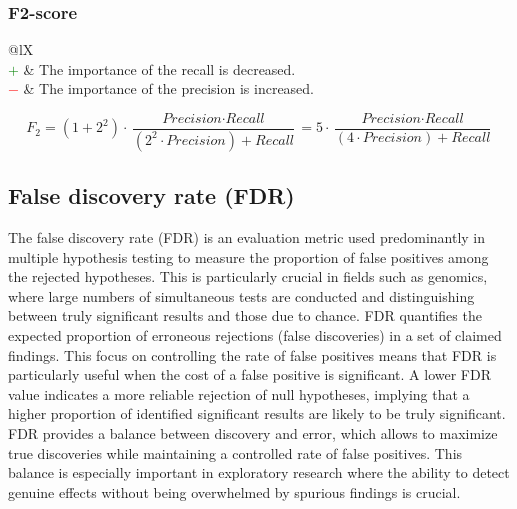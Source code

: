 \documentclass{article}
\begin{document}
\subsubsection[F2-score]{F2-score \cite{van2004geometry, taha2015metrics}}

\begin{table}[H]\centering
    \begin{tabularx}{\textwidth}{@{}lX}
         \\
        \textcolor{Green}{$+$} & The importance of the recall is decreased. \\
        \textcolor{Red}{$-$}   & The importance of the precision is increased.
    \end{tabularx}
\end{table}

\begin{equation}
    F_2 = (1 + 2^2) \cdot \dfrac{\textit{Precision} \cdot \textit{Recall}}{(2^2 \cdot \textit{Precision}) + \textit{Recall}} = 5 \cdot \dfrac{\textit{Precision} \cdot \textit{Recall}}{(4 \cdot \textit{Precision}) + \textit{Recall}}
%
    \label{equation:F2-score}
\end{equation}


\subsection[False discovery rate (FDR)]{False discovery rate (FDR) \cite{benjamini1995controlling, benjamini2001control}}

The false discovery rate (FDR) \cite{benjamini1995controlling, benjamini2001control} is an evaluation metric used predominantly in multiple hypothesis testing to measure the proportion of false positives among the rejected hypotheses. This is particularly crucial in fields such as genomics, where large numbers of simultaneous tests are conducted and distinguishing between truly significant results and those due to chance. FDR quantifies the expected proportion of erroneous rejections (false discoveries) in a set of claimed findings. This focus on controlling the rate of false positives means that FDR is particularly useful when the cost of a false positive is significant. A lower FDR value indicates a more reliable rejection of null hypotheses, implying that a higher proportion of identified significant results are likely to be truly significant. FDR provides a balance between discovery and error, which allows to maximize true discoveries while maintaining a controlled rate of false positives. This balance is especially important in exploratory research where the ability to detect genuine effects without being overwhelmed by spurious findings is crucial.
\end{document}

